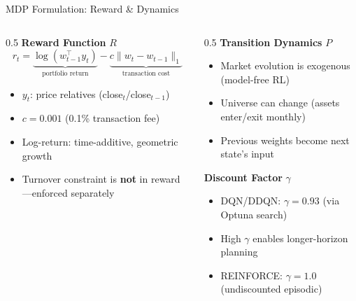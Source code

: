 \documentclass[aspectratio=169]{beamer}
\begin{document}
\begin{frame}{MDP Formulation: Reward \& Dynamics}
\small

\begin{columns}[T,totalwidth=\textwidth]
\begin{column}{0.5\textwidth}
\textbf{Reward Function} $R$
\[
r_t = \underbrace{\log(w_{t-1}^\top y_t)}_{\text{portfolio return}} - \underbrace{c\|w_t - w_{t-1}\|_1}_{\text{transaction cost}}
\]
\begin{itemize}\setlength{\itemsep}{3pt}
  \item $y_t$: price relatives (close$_t$/close$_{t-1}$)
  \item $c = 0.001$ (0.1\% transaction fee)
  \item Log-return: time-additive, geometric growth
  \item Turnover constraint is \textbf{not} in reward---enforced separately
\end{itemize}
\end{column}

\begin{column}{0.5\textwidth}
\textbf{Transition Dynamics} $P$
\begin{itemize}\setlength{\itemsep}{3pt}
  \item Market evolution is exogenous (model-free RL)
  \item Universe can change (assets enter/exit monthly)
  \item Previous weights become next state's input
\end{itemize}

\vspace{0.5em}
\textbf{Discount Factor} $\gamma$
\begin{itemize}\setlength{\itemsep}{3pt}
  \item DQN/DDQN: $\gamma = 0.93$ (via Optuna search)
  \item High $\gamma$ enables longer-horizon planning
  \item REINFORCE: $\gamma = 1.0$ (undiscounted episodic)
\end{itemize}
\end{column}
\end{columns}

\end{frame}
\end{document}

